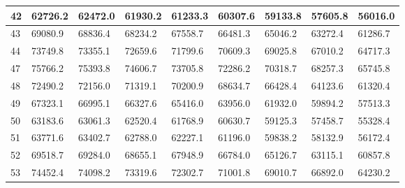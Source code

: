\documentclass{article}
\begin{document}
\begin{table}[!htbp]
{\begin{tabular}{ |p{3cm}|| p{3cm} | p{3cm} | p{3cm} | p{3cm} | p{3cm} | p{3cm} | p{3cm} | p{3cm}| }
\hline
\small 42\small & 62726.2\small & 62472.0\small & 61930.2\small & 61233.3\small & 60307.6\small & 59133.8\small & 57605.8\small & 56016.0 \\ 
\hline
\small 43\small & 69080.9\small & 68836.4\small & 68234.2\small & 67558.7\small & 66481.3\small & 65046.2\small & 63272.4\small & 61286.7 \\ 
\hline
\small 44\small & 73749.8\small & 73355.1\small & 72659.6\small & 71799.6\small & 70609.3\small & 69025.8\small & 67010.2\small & 64717.3 \\ 
\hline
\small 47\small & 75766.2\small & 75393.8\small & 74606.7\small & 73705.8\small & 72286.2\small & 70318.7\small & 68257.3\small & 65745.8 \\ 
\hline
\small 48\small & 72490.2\small & 72156.0\small & 71319.1\small & 70200.9\small & 68634.7\small & 66428.4\small & 64123.6\small & 61320.4 \\ 
\hline
\small 49\small & 67323.1\small & 66995.1\small & 66327.6\small & 65416.0\small & 63956.0\small & 61932.0\small & 59894.2\small & 57513.3 \\ 
\hline
\small 50\small & 63183.6\small & 63061.3\small & 62520.4\small & 61768.9\small & 60630.7\small & 59125.3\small & 57458.7\small & 55328.4 \\ 
\hline
\small 51\small & 63771.6\small & 63402.7\small & 62788.0\small & 62227.1\small & 61196.0\small & 59838.2\small & 58132.9\small & 56172.4 \\ 
\hline
\small 52\small & 69518.7\small & 69284.0\small & 68655.1\small & 67948.9\small & 66784.0\small & 65126.7\small & 63115.1\small & 60857.8 \\ 
\hline
\small 53\small & 74452.4\small & 74098.2\small & 73319.6\small & 72302.7\small & 71001.8\small & 69010.7\small & 66892.0\small & 64230.2 \\ 
\hline
\end{tabular}%
}
\end{table}
\end{document}
